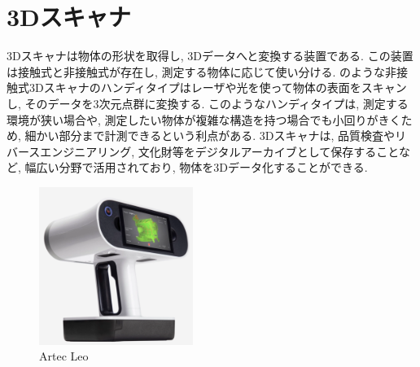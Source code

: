 \section{3Dスキャナ}
3Dスキャナは物体の形状を取得し, 3Dデータへと変換する装置である.
この装置は接触式と非接触式が存在し, 測定する物体に応じて使い分ける.
のような非接触式3Dスキャナのハンディタイプはレーザや光を使って物体の表面をスキャンし, そのデータを3次元点群に変換する.
このようなハンディタイプは, 測定する環境が狭い場合や, 測定したい物体が複雑な構造を持つ場合でも小回りがきくため, 細かい部分まで計測できるという利点がある.
3Dスキャナは, 品質検査やリバースエンジニアリング, 文化財等をデジタルアーカイブとして保存することなど, 幅広い分野で活用されており, 物体を3Dデータ化することができる.

\vspace{5mm}
\begin{figure}[H]
     \centering
     \includegraphics[width=50mm]{images/png/artecleo.png}
     \caption{Artec Leo}
     \label{Fig:artecleo}
   \end{figure}